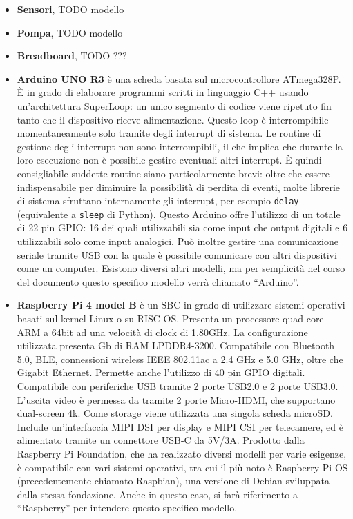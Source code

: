 \documentclass[12pt,a4paper,openright,twoside, openany]{book}
\begin{document}
\begin{itemize}[noitemsep]
    \item \textbf{Sensori}, TODO modello
    \item \textbf{Pompa}, TODO modello
    \item \textbf{Breadboard}, TODO ???
    \item \textbf{Arduino UNO R3} è una scheda basata sul microcontrollore ATmega328P. È in grado di elaborare programmi scritti in linguaggio C++ usando un'architettura SuperLoop: un unico segmento di codice viene ripetuto fin tanto che il dispositivo riceve alimentazione. Questo loop è interrompibile momentaneamente solo tramite degli interrupt di sistema. Le routine di gestione degli interrupt non sono interrompibili, il che implica che durante la loro esecuzione non è possibile gestire eventuali altri interrupt. È quindi consigliabile suddette routine siano particolarmente brevi: oltre che essere indispensabile per diminuire la possibilità di perdita di eventi, molte librerie di sistema sfruttano internamente gli interrupt, per esempio \texttt{delay} (equivalente a \texttt{sleep} di Python).
    Questo Arduino offre l'utilizzo di un totale di 22 pin \ac{GPIO}: 16 dei quali utilizzabili sia come input che output digitali e 6 utilizzabili solo come input analogici. Può inoltre gestire una comunicazione seriale tramite USB con la quale è possibile comunicare con altri dispositivi come un computer.
    Esistono diversi altri modelli, ma per semplicità nel corso del documento questo specifico modello verrà chiamato ``Arduino''.
    \item \textbf{Raspberry Pi 4 model B} è un \ac{SBC} in grado di utilizzare sistemi operativi basati sul kernel Linux o su RISC OS. Presenta un processore quad-core ARM a 64bit ad una velocità di clock di 1.80GHz. La configurazione utilizzata presenta  Gb di RAM LPDDR4-3200. Compatibile con Bluetooth 5.0, BLE, connessioni wireless IEEE 802.11ac a 2.4 GHz e 5.0 GHz, oltre che Gigabit Ethernet. Permette anche l'utilizzo di 40 pin GPIO digitali. Compatibile con periferiche USB tramite 2 porte USB2.0 e 2 porte USB3.0. L'uscita video è permessa da tramite 2 porte Micro-HDMI, che supportano dual-screen 4k. Come storage viene utilizzata una singola scheda microSD. Include un'interfaccia MIPI DSI per display e MIPI CSI per telecamere, ed è alimentato tramite un connettore USB-C da 5V/3A. Prodotto dalla Raspberry Pi Foundation, che ha realizzato diversi modelli per varie esigenze, è compatibile con vari sistemi operativi, tra cui il più noto è Raspberry Pi OS (precedentemente chiamato Raspbian), una versione di Debian sviluppata dalla stessa fondazione. Anche in questo caso, si farà riferimento a ``Raspberry'' per intendere questo specifico modello.
\end{itemize}
\end{document}
